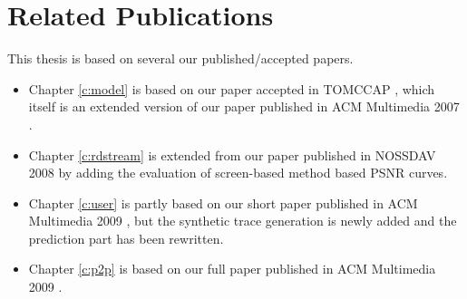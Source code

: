 \documentclass[11pt, a4paper]{report}
\begin{document}
\chapter{Related Publications}
This thesis is based on several our published/accepted papers.
\begin{itemize}
    \item Chapter \ref{c:model} is based on our paper accepted in TOMCCAP \cite{modeling:cheng}, which itself is an extended version of our paper published in ACM Multimedia 2007 \cite{1291399}.
    \item Chapter \ref{c:rdstream} is extended from our paper published in NOSSDAV 2008 \cite{cheng:receiver} by adding the evaluation of screen-based method based PSNR curves.
    \item Chapter \ref{c:user} is partly based on our short paper published in ACM Multimedia 2009 \cite{towards:ransi}, but the synthetic trace generation is newly added and the prediction part has been rewritten. 
    \item Chapter \ref{c:p2p} is based on our full paper published in ACM Multimedia 2009 \cite{peer:cheng}.
\end{itemize}



\end{document}
